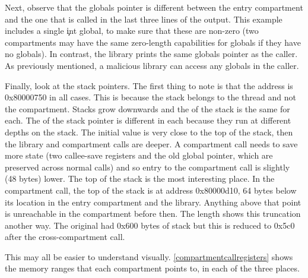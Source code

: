 Next, observe that the globals pointer is different between the entry compartment and the one that is called in the last three lines of the output.
This example includes a single \c{int} global, to make sure that these are non-zero (two compartments may have the same zero-length capabilities for globals if they have no globals).
In contrast, the library prints the same globals pointer as the caller.
As previously mentioned, a malicious library can access any globals in the caller.

Finally, look at the stack pointers.
The first thing to note is that the  address is 0x80000750 in all cases.
This is because the stack belongs to the thread and not the compartment. 
Stacks grow downwards and the  of the stack is the same for each.
The  of the stack pointer is different in each because they run at different depths on the stack.
The initial value is very close to the top of the stack, then the library and compartment calls are deeper.
A compartment call needs to save more state (two callee-save registers and the old global pointer, which are preserved across normal calls) and so entry to the compartment call is slightly (48 bytes) lower.
The top of the stack is the most interesting place.
In the compartment call, the top of the stack is at address 0x80000d10, 64 bytes below its location in the entry compartment and the library.
Anything above that point is unreachable in the compartment before then.
The length shows this truncation another way.
The original had 0x600 bytes of stack but this is reduced to 0x5c0 after the cross-compartment call.

This may all be easier to understand visually.
\ref{compartmentcallregisters} shows the memory ranges that each compartment points to, in each of the three places.


